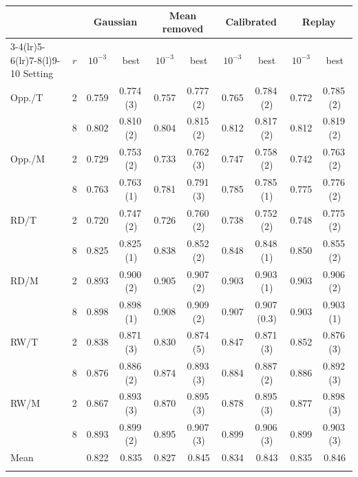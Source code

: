 \begin{tabular}{@{}lc cc cc cc cc@{}}
\toprule
 & & \multicolumn{2}{c}{Gaussian} & \multicolumn{2}{c}{Mean removed} & \multicolumn{2}{c}{Calibrated} & \multicolumn{2}{c}{Replay} \\
\cmidrule(lr){3-4}\cmidrule(lr){5-6}\cmidrule(lr){7-8}\cmidrule(l){9-10}
Setting & $r$ & $10^{-3}$ & best & $10^{-3}$ & best & $10^{-3}$ & best & $10^{-3}$ & best \\
\midrule
Opp./T & 2 & 0.759 & 0.774\,{\scriptsize(3)} & 0.757 & 0.777\,{\scriptsize(2)} & 0.765 & 0.784\,{\scriptsize(2)} & 0.772 & 0.785\,{\scriptsize(2)} \\
 & 8 & 0.802 & 0.810\,{\scriptsize(2)} & 0.804 & 0.815\,{\scriptsize(2)} & 0.812 & 0.817\,{\scriptsize(2)} & 0.812 & 0.819\,{\scriptsize(2)} \\
Opp./M & 2 & 0.729 & 0.753\,{\scriptsize(2)} & 0.733 & 0.762\,{\scriptsize(3)} & 0.747 & 0.758\,{\scriptsize(2)} & 0.742 & 0.763\,{\scriptsize(2)} \\
 & 8 & 0.763 & 0.763\,{\scriptsize(1)} & 0.781 & 0.791\,{\scriptsize(3)} & 0.785 & 0.785\,{\scriptsize(1)} & 0.775 & 0.776\,{\scriptsize(2)} \\
RD/T & 2 & 0.720 & 0.747\,{\scriptsize(2)} & 0.726 & 0.760\,{\scriptsize(2)} & 0.738 & 0.752\,{\scriptsize(2)} & 0.748 & 0.775\,{\scriptsize(2)} \\
 & 8 & 0.825 & 0.825\,{\scriptsize(1)} & 0.838 & 0.852\,{\scriptsize(2)} & 0.848 & 0.848\,{\scriptsize(1)} & 0.850 & 0.855\,{\scriptsize(2)} \\
RD/M & 2 & 0.893 & 0.900\,{\scriptsize(2)} & 0.905 & 0.907\,{\scriptsize(2)} & 0.903 & 0.903\,{\scriptsize(1)} & 0.903 & 0.906\,{\scriptsize(2)} \\
 & 8 & 0.898 & 0.898\,{\scriptsize(1)} & 0.908 & 0.909\,{\scriptsize(2)} & 0.907 & 0.907\,{\scriptsize(0.3)} & 0.903 & 0.903\,{\scriptsize(1)} \\
RW/T & 2 & 0.838 & 0.871\,{\scriptsize(3)} & 0.830 & 0.874\,{\scriptsize(5)} & 0.847 & 0.871\,{\scriptsize(3)} & 0.852 & 0.876\,{\scriptsize(3)} \\
 & 8 & 0.876 & 0.886\,{\scriptsize(2)} & 0.874 & 0.893\,{\scriptsize(3)} & 0.884 & 0.887\,{\scriptsize(2)} & 0.886 & 0.892\,{\scriptsize(3)} \\
RW/M & 2 & 0.867 & 0.893\,{\scriptsize(3)} & 0.870 & 0.895\,{\scriptsize(3)} & 0.878 & 0.895\,{\scriptsize(3)} & 0.877 & 0.898\,{\scriptsize(3)} \\
 & 8 & 0.893 & 0.899\,{\scriptsize(2)} & 0.895 & 0.907\,{\scriptsize(3)} & 0.899 & 0.906\,{\scriptsize(3)} & 0.899 & 0.903\,{\scriptsize(3)} \\
\midrule
Mean &  & 0.822 & 0.835 & 0.827 & 0.845 & 0.834 & 0.843 & 0.835 & 0.846 \\
\botrule
\end{tabular}
